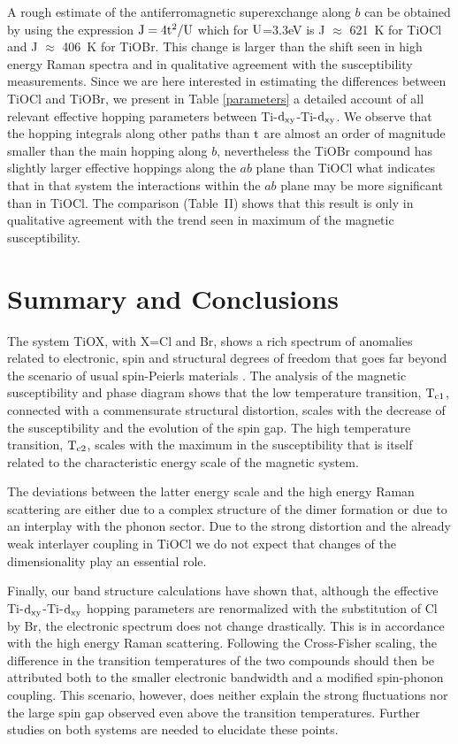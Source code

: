 \documentclass[prb,preprint,draft,amsmath,showpacs]{revtex4}
\begin{document}
A rough estimate of the antiferromagnetic superexchange along $b$ can be obtained by
using the expression $\rm J=4t^2/U$  which for $\rm U$=3.3eV is J $\approx$ 621~K for
TiOCl and J $\approx$ 406~K for TiOBr. This change is larger than the shift seen in high
energy Raman spectra and in qualitative agreement with the susceptibility measurements.
Since we are here interested in estimating the differences between TiOCl and TiOBr, we
present in Table \ref{parameters} a detailed account of all relevant effective hopping
parameters between Ti-$\rm d_{xy}$-Ti-$\rm d_{xy}$. We observe that the hopping
integrals along other paths than $\rm t$ are almost an order of magnitude smaller than
the main hopping along $b$, nevertheless the TiOBr compound has slightly larger
effective hoppings along the $ab$ plane than TiOCl what indicates that in that system
the interactions within the $ab$ plane may be more significant than in TiOCl. The
comparison (Table~II) shows that this result is only in qualitative agreement with the
trend seen in maximum of the magnetic susceptibility.


\section{Summary and Conclusions}

The system TiOX, with X=Cl and Br, shows a rich spectrum of anomalies related to
electronic, spin and structural degrees of freedom that goes far beyond the scenario of
usual spin-Peierls materials \cite{cross79}. The analysis of the magnetic susceptibility
and phase diagram shows that the low temperature transition, $\rm T_{c1}$, connected
with a commensurate structural distortion, scales with the decrease of the
susceptibility and the evolution of the spin gap. The high temperature transition, $\rm
T_{c2}$, scales with the maximum in the susceptibility that is itself related to the
characteristic energy scale of the magnetic system.

The deviations between the latter energy scale and the high energy Raman scattering are
either due to a complex structure of the dimer formation or due to an interplay with the
phonon sector. Due to the strong distortion and the already weak interlayer coupling in
TiOCl we do not expect that changes of the dimensionality play an essential role.

Finally, our band structure calculations have shown that, although the effective Ti-$\rm
d_{xy}$-Ti-$\rm d_{xy}$ hopping parameters are renormalized with the substitution of Cl
by Br, the electronic spectrum does not change drastically. This is in accordance with
the high energy Raman scattering. Following the Cross-Fisher scaling, the difference in
the transition temperatures of the two compounds should then be attributed both to the
smaller electronic bandwidth and a modified spin-phonon coupling. This scenario,
however, does neither explain the strong fluctuations nor the large spin gap observed
even above the transition temperatures. Further studies on both systems are needed to
elucidate these points.
\end{document}

